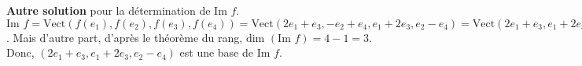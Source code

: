 {{\begin{center}
\end{center}

\textbf{Autre solution} pour la détermination de $\mbox{Im }f$.
$\mbox{Im }f=\mbox{Vect}(f(e_1),f(e_2),f(e_3),f(e_4))=\mbox{Vect}(2e_1+e_3,-e_2+e_4,e_1+2e_3,e_2-e_4)
=\mbox{Vect}(2e_1+e_3,e_1+2e_3,e_2-e_4)$. Mais d'autre part, d'après le théorème du rang,
$\mbox{dim }(\mbox{Im }f)=4-1=3$. Donc, $(2e_1+e_3,e_1+2e_3,e_2-e_4)$ est une base de $\mbox{Im }f$.}
}